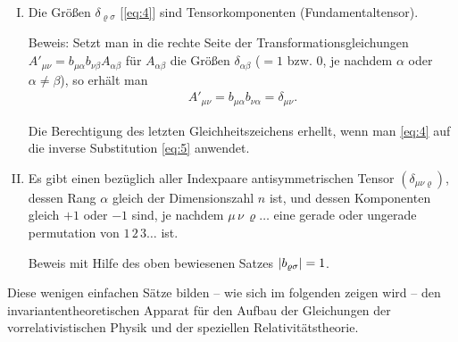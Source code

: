 \begin{enumerate}[I.]
\item
Die Größen $\delta_{\varrho\sigma}$ [\cref{eq:4}] sind Tensorkomponenten 
(Fundamentaltensor).

Beweis: Setzt man in die rechte Seite der 
Transformationsgleichungen 
$A'_{\mu\nu} = b_{\mu\alpha} b_{\nu\beta} A_{\alpha\beta}$ für 
$A_{\alpha\beta}$ die Größen $\delta_{\alpha\beta}$ ($=1$ bzw. $0$, je nachdem 
$\alpha$ oder $\alpha \neq \beta$), so erhält man
\begin{align*}
A'_{\mu\nu} = b_{\mu\alpha} b_{\nu\alpha} = \delta_{\mu\nu}.
\end{align*}

Die Berechtigung des letzten Gleichheitszeichens erhellt, wenn man \eqref{eq:4} 
auf die inverse Substitution \eqref{eq:5} anwendet.

\item
Es gibt einen bezüglich aller Indexpaare antisymmetrischen Tensor 
$(\delta_{\mu\nu\varrho})$, dessen Rang $\alpha$ gleich der Dimensionszahl $n$ 
ist, und dessen Komponenten gleich $+1$ oder $-1$ sind, je nachdem 
$\mu\,\nu\,\varrho\ldots$ eine gerade oder ungerade permutation von 
$1\,2\,3\ldots$ ist.

Beweis mit Hilfe des oben bewiesenen Satzes ${\left|b_{\varrho\sigma}\right|} = 1$.
\end{enumerate}

Diese wenigen einfachen Sätze bilden -- wie sich im folgenden zeigen wird -- 
den invariantentheoretischen Apparat für den Aufbau der Gleichungen der 
vorrelativistischen Physik und der speziellen Relativitätstheorie.


